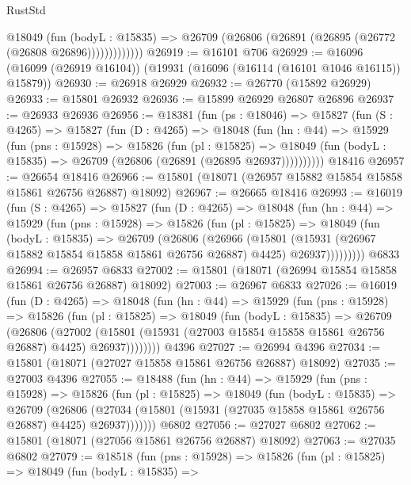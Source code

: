 \begin{lexlean}{RustStd}
\begin{coremodule}
                @18049
                  (fun (bodyL : @15835) =>
                  @26709 (@26806 (@26891 (@26895 (@26772 (@26808 @26896)))))))))))))
@26919 := @16101 @706
@26929 := @16096 (@16099 (@26919 @16104)) (@19931 (@16096 (@16114 (@16101 @1046 @16115)) @15879))
@26930 := @26918 @26929
@26932 := @26770 (@15892 @26929)
@26933 := @15801 @26932
@26936 := @15899 @26929 @26807 @26896
@26937 := @26933 @26936
@26956 := @18381
    (fun (ps : @18046) =>
    @15827
      (fun (S : @4265) =>
      @15827
        (fun (D : @4265) =>
        @18048
          (fun (hn : @44) =>
          @15929
            (fun (pns : @15928) =>
            @15826
              (fun (pl : @15825) =>
              @18049 (fun (bodyL : @15835) => @26709 (@26806 (@26891 (@26895 @26937))))))))))
    @18416
@26957 := @26654 @18416
@26966 := @15801 (@18071 (@26957 @15882 @15854 @15858 @15861 @26756 @26887) @18092)
@26967 := @26665 @18416
@26993 := @16019
    (fun (S : @4265) =>
    @15827
      (fun (D : @4265) =>
      @18048
        (fun (hn : @44) =>
        @15929
          (fun (pns : @15928) =>
          @15826
            (fun (pl : @15825) =>
            @18049
              (fun (bodyL : @15835) =>
              @26709
                (@26806
                  (@26966
                    (@15801
                      (@15931 (@26967 @15882 @15854 @15858 @15861 @26756 @26887) @4425)
                      @26937)))))))))
    @6833
@26994 := @26957 @6833
@27002 := @15801 (@18071 (@26994 @15854 @15858 @15861 @26756 @26887) @18092)
@27003 := @26967 @6833
@27026 := @16019
    (fun (D : @4265) =>
    @18048
      (fun (hn : @44) =>
      @15929
        (fun (pns : @15928) =>
        @15826
          (fun (pl : @15825) =>
          @18049
            (fun (bodyL : @15835) =>
            @26709
              (@26806
                (@27002
                  (@15801 (@15931 (@27003 @15854 @15858 @15861 @26756 @26887) @4425) @26937))))))))
    @4396
@27027 := @26994 @4396
@27034 := @15801 (@18071 (@27027 @15858 @15861 @26756 @26887) @18092)
@27035 := @27003 @4396
@27055 := @18488
    (fun (hn : @44) =>
    @15929
      (fun (pns : @15928) =>
      @15826
        (fun (pl : @15825) =>
        @18049
          (fun (bodyL : @15835) =>
          @26709
            (@26806
              (@27034 (@15801 (@15931 (@27035 @15858 @15861 @26756 @26887) @4425) @26937)))))))
    @6802
@27056 := @27027 @6802
@27062 := @15801 (@18071 (@27056 @15861 @26756 @26887) @18092)
@27063 := @27035 @6802
@27079 := @18518
    (fun (pns : @15928) =>
    @15826
      (fun (pl : @15825) =>
      @18049
        (fun (bodyL : @15835) =>

\end{coremodule}
\end{lexlean}

